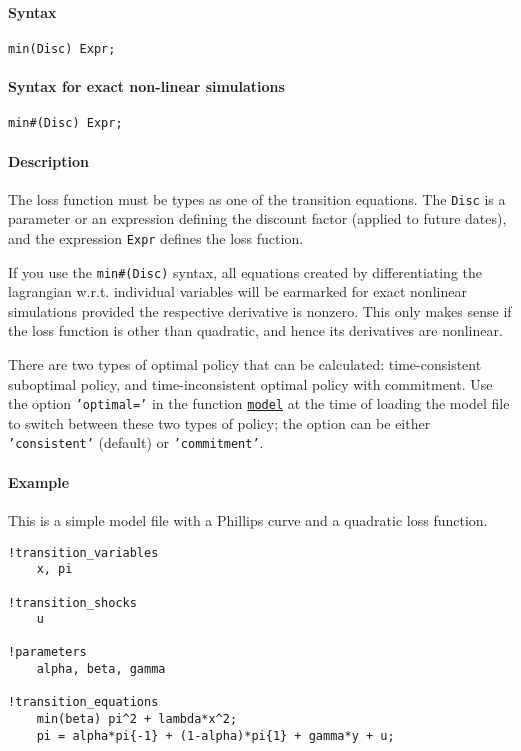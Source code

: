 


	\paragraph{Syntax}

\begin{verbatim}
min(Disc) Expr;
\end{verbatim}

\paragraph{Syntax for exact non-linear
simulations}

\begin{verbatim}
min#(Disc) Expr;
\end{verbatim}

\paragraph{Description}

The loss function must be types as one of the transition equations. The
\texttt{Disc} is a parameter or an expression defining the discount
factor (applied to future dates), and the expression \texttt{Expr}
defines the loss fuction.

If you use the \texttt{min\#(Disc)} syntax, all equations created by
differentiating the lagrangian w.r.t. individual variables will be
earmarked for exact nonlinear simulations provided the respective
derivative is nonzero. This only makes sense if the loss function is
other than quadratic, and hence its derivatives are nonlinear.

There are two types of optimal policy that can be calculated:
time-consistent suboptimal policy, and time-inconsistent optimal policy
with commitment. Use the option \texttt{'optimal='} in the function
\href{model/model}{\texttt{model}} at the time of loading the model file
to switch between these two types of policy; the option can be either
\texttt{'consistent'} (default) or \texttt{'commitment'}.

\paragraph{Example}

This is a simple model file with a Phillips curve and a quadratic loss
function.

\begin{verbatim}
!transition_variables
    x, pi

!transition_shocks
    u

!parameters
    alpha, beta, gamma

!transition_equations
    min(beta) pi^2 + lambda*x^2;
    pi = alpha*pi{-1} + (1-alpha)*pi{1} + gamma*y + u;
\end{verbatim}


